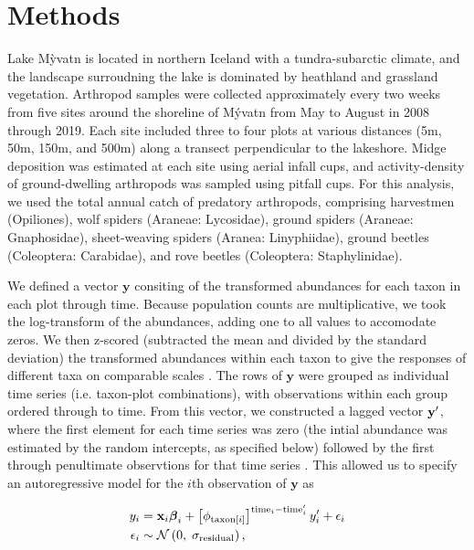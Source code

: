 

\section*{Methods}

Lake M\`{y}vatn is located in northern Iceland with a tundra-subarctic climate,
and the landscape surroudning the lake is dominated by heathland and grassland vegetation.
Arthropod samples were collected approximately every two weeks from five sites around the
shoreline of M\'{y}vatn from May to August in 2008 through 2019.
Each site included three to four plots at various distances
(5m, 50m, 150m, and 500m) along a transect perpendicular to the lakeshore.
Midge deposition was estimated at each site using aerial infall cups,
and activity-density of ground-dwelling arthropods was sampled using pitfall cups.
For this analysis, we used the total annual catch of predatory arthropods,
comprising harvestmen (Opiliones),
wolf spiders (Araneae: Lycosidae),
ground spiders (Araneae: Gnaphosidae),
sheet-weaving spiders (Aranea: Linyphiidae),
ground beetles (Coleoptera: Carabidae),
and rove beetles (Coleoptera: Staphylinidae).

We defined a vector $\mathbf{y}$ consiting of the transformed abundances for each taxon
in each plot through time.
Because population counts are multiplicative, we took the log-transform of the abundances,
adding one to all values to accomodate zeros.
We then z-scored (subtracted the mean and divided by the standard deviation)
the transformed abundances within each taxon
to give the responses of different taxa on comparable scales \citep{Jackson2012}.
The rows of $\mathbf{y}$ were grouped as individual time series
(i.e. taxon-plot combinations),
with observations within each group ordered through to time.
From this vector,
we constructed a lagged vector $\mathbf{y\sp{\prime}}$,
where the first element for each time series was zero
(the intial abundance was estimated by the random intercepts, as specified below)
followed by the first through
penultimate observtions for that time series \citep{Ives2006}.
This allowed us to specify an autoregressive model for the $i$th observation of
$\mathbf{y}$ as

\begin{equation} \label{eq:y-i}
\begin{split}
    y_i &= \mathbf{x}_i {\boldsymbol\beta}_i +
        \left[ \phi_{\text{taxon}[i]} \right]^{\text{time}_i - \text{time}\sp{\prime}_i}
        y\sp{\prime}_i + \epsilon_i \\
    \epsilon_i &\sim \mathcal{N} \left(0, \; \sigma_{\text{residual}} \right)
    \text{,}
\end{split}
\end{equation}

